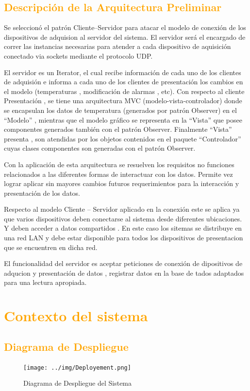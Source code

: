\subsection{\textcolor{orange}{Descripción de la Arquitectura Preliminar}}
Se seleccionó el patrón Cliente–Servidor para atacar el modelo de conexión de
los dispositivos de adquision al servidor del sistema. El servidor será el
encargado de correr las instancias necesarias para atender a cada dispositivo
de aquisición conectado via sockets mediante el protocolo UDP.

El servidor es un Iterator, el cual recibe información de cada uno de los
clientes de adquisión e informa a cada uno de los clientes de presentación los
cambios en el modelo (temperaturas , modificación de alarmas , etc).
Con respecto al cliente Presentación , se tiene una arquitectura MVC
(modelo-vista-controlador) donde se encapsulan los datos  de
temperatura (generados por patrón Observer) en el “Modelo” , mientras que el
modelo gráfico se representa en la “Vista” que posee componentes generados
también con el patrón Observer. Finalmente “Vista” presenta , son atendidas por
los objetos contenidos en el paquete “Controlador” cuyas clases componentes son
generadas con el patrón Observer.

Con la aplicación de esta arquitectura se resuelven los requisitos no funciones
relacionados a las diferentes formas de interactuar con los datos.
Permite vez lograr aplicar sin mayores cambios futuros requerimientos para la
interacción y presentación de los datos.

Respecto al modelo Cliente – Servidor aplicado en la conexión este se
aplica ya que varios dispositivos deben conectarse al sistema  desde diferentes
ubicaciones. Y deben acceder a datos compartidos . En este caso los sitemas se
distribuye en una red LAN y debe estar disponible para todos los dispositivos de
presentacion que se encuentren en dicha red.

El funcionalidad del servidor es aceptar peticiones de conexión de dipositivos
de adqucion y presentación de datos , registrar datos en la base de tados
adaptados para una lectura apropiada.

\newpage
\section{\textcolor{orange}{Contexto del sistema}}
\subsection{\textcolor{orange}{Diagrama de Despliegue}}
\begin{figure}[h!]
 \begin{center}
  \texttt{[image: ../img/Deployement.png]}
  \caption{Diagrama de Despliegue del Sistema}
  \label{fig:esquema}
 \end{center}
\end{figure}

